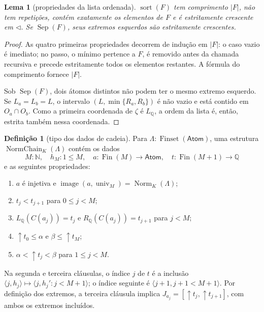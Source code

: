 \documentclass[12pt,a4paper]{article}
\theoremstyle{preciso}
\newtheorem{lema}[teorema]{Lema}
\theoremstyle{definition}
\newtheorem{definicao}[teorema]{Definição}
\newcommand{\N}{\mathbb N}
\newcommand{\Q}{\mathbb Q}
\newcommand{\Atoms}{\mathsf{Atom}}
\newcommand{\Fin}{\operatorname{Fin}}
\newcommand{\FS}{\operatorname{Finset}}
\newcommand{\Norm}{\operatorname{Norm}}
\newcommand{\Sep}{\operatorname{Sep}}
\theoremstyle{preciso}
\theoremstyle{preciso}
\theoremstyle{preciso}
\theoremstyle{preciso}
\theoremstyle{definition}
\theoremstyle{preciso}
\theoremstyle{definition}
\theoremstyle{preciso}
\theoremstyle{preciso}
\theoremstyle{definition}
\begin{document}
\begin{lema}[propriedades da lista ordenada]\label{map:normalizacao:7.2}\label{normalizacao:lem:sort}
$\operatorname{sort}(F)$ tem comprimento $|F|$, não tem repetições,
contém exatamente os elementos de $F$ e é estritamente crescente
em $\triangleleft$. Se $\Sep(F)$, seus extremos esquerdos são
estritamente crescentes.
\end{lema}
\begin{proof}
As quatro primeiras propriedades decorrem de indução em $|F|$:
o caso vazio é imediato; no passo, o mínimo pertence a $F$, é
removido antes da chamada recursiva e precede estritamente todos
os elementos restantes. A fórmula do comprimento fornece $|F|$.

Sob $\Sep(F)$, dois átomos distintos não podem ter o mesmo
extremo esquerdo. Se $L_a=L_b=L$, o intervalo
$(L,\min\{R_a,R_b\})$ é não vazio e está contido em $O_a\cap O_b$.
Como a primeira coordenada de $\zeta$ é $L_\Q$, a ordem da lista
é, então, estrita também nessa coordenada.
\end{proof}

\begin{definicao}[tipo dos dados de cadeia]\label{map:normalizacao:7.3}\label{normalizacao:def:chain}
Para $\Lambda:\FS(\Atoms)$, uma estrutura
$\operatorname{NormChain}_K(\Lambda)$ contém os dados
\[
 M:\N,\quad h_M:1\le M,\quad
 a:\Fin(M)\to\Atoms,\quad t:\Fin(M+1)\to\Q
\]
e as seguintes propriedades:
\begin{enumerate}
\item $a$ é injetiva e
$\operatorname{image}(a,\operatorname{univ}_M)=\Norm_K(\Lambda)$;
\item $t_j<t_{j+1}$ para $0\le j<M$;
\item $L_\Q(C(a_j))=t_j$ e $R_\Q(C(a_j))=t_{j+1}$ para $j<M$;
\item $\uparrow t_0\le\alpha$ e $\beta\le\uparrow t_M$;
\item $\alpha<\uparrow t_j<\beta$ para $1\le j<M$.
\end{enumerate}
Na segunda e terceira cláusulas, o índice $j$ de $t$ é a inclusão
$\langle j,h_j\rangle\mapsto\langle j,h_j':j<M+1\rangle$;
o índice seguinte é $\langle j+1,j+1<M+1\rangle$.
Por definição dos extremos, a terceira cláusula implica
$J_{a_j}=[\uparrow t_j,\uparrow t_{j+1}]$, com ambos os extremos incluídos.
\end{definicao}
\end{document}
